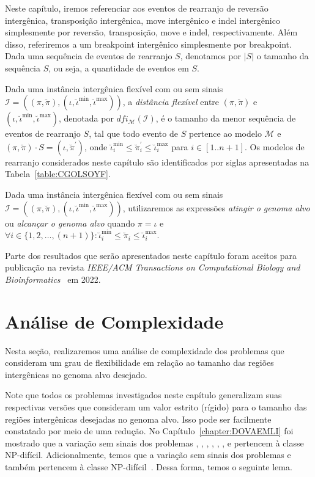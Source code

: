 Neste capítulo, iremos referenciar aos eventos de rearranjo de reversão intergênica, transposição intergênica, move intergênico e indel intergênico simplesmente por reversão, transposição, move e indel, respectivamente. Além disso, referiremos a um breakpoint intergênico simplesmente por breakpoint. Dada uma sequência de eventos de rearranjo $S$, denotamos por $|S|$ o tamanho da sequência $S$, ou seja, a quantidade de eventos em $S$.

Dada uma instância intergênica flexível com ou sem sinais $\mathcal{I} = ((\pi,\breve\pi),(\iota,\breve\iota^{\min},\breve\iota^{\max}))$, a \emph{distância flexível} entre $(\pi,\breve\pi)$ e $(\iota,\breve\iota^{\min},\breve\iota^{\max})$, denotada por $dfi_{\mathcal{M}}(\mathcal{I})$, é o tamanho da menor sequência de eventos de rearranjo $S$, tal que todo evento de $S$ pertence ao modelo $\mathcal{M}$ e $(\pi,\breve\pi) \cdot S = (\iota,\breve\pi^{\prime})$, onde $\breve\iota^{\min}_i \le \breve\pi^{\prime}_i \le \breve\iota^{\max}_i$ para $i \in [1..n+1]$. Os modelos de rearranjo considerados neste capítulo são identificados por siglas apresentadas na Tabela~\ref{table:CGOLSOYF}.



Dada uma instância intergênica flexível com ou sem sinais $\mathcal{I} = ((\pi,\breve\pi),(\iota,\breve\iota^{\min},\breve\iota^{\max}))$, utilizaremos as expressões \emph{atingir o genoma alvo} ou \emph{alcançar o genoma alvo} quando $\pi = \iota$ e $\forall i \in \{1,2,\dots,({n+1})\}: \breve\iota^{\min}_i \le \breve\pi_i \le \breve\iota^{\max}_i$.

Parte dos resultados que serão apresentados neste capítulo foram aceitos para publicação na revista \emph{IEEE/ACM Transactions on Computational Biology and Bioinformatics}~\cite{2022a-brito-etal} em 2022.

\section{Análise de Complexidade}

Nesta seção, realizaremos uma análise de complexidade dos problemas que consideram um grau de flexibilidade em relação ao tamanho das regiões intergênicas no genoma alvo desejado. 

Note que todos os problemas investigados neste capítulo generalizam suas respectivas versões que consideram um valor estrito (rígido) para o tamanho das regiões intergênicas desejadas no genoma alvo. Isso pode ser facilmente constatado por meio de uma redução. No Capítulo~\ref{chapter:DOVAEMLI} foi mostrado que a variação sem sinais dos problemas \SbIR{}, \SbIRI{}, \SbIRM{}, \SbIRMI{}, \SbIRT{}, \SbIRTI{}, \SbIRTM{} e \SbIRTMI{} pertencem à classe NP-difícil. Adicionalmente, temos que a variação sem sinais dos problemas \SbIT{} e \SbITM{} também pertencem à classe NP-difícil~\cite{2021a-oliveira-etal}. Dessa forma, temos o seguinte lema.

